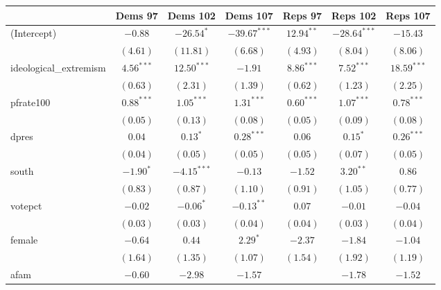 \documentclass[12pt]{article}
\begin{document}
\begin{table}
	\begin{center}
		\begin{tabular}{l c c c c c c }
			\hline
			& Dems 97 & Dems 102 & Dems 107 & Reps 97 & Reps 102 & Reps 107 \\
			\hline
			(Intercept)            & $-0.88$      & $-26.54^{*}$  & $-39.67^{***}$ & $12.94^{**}$ & $-28.64^{***}$ & $-15.43$      \\
			& $(4.61)$     & $(11.81)$     & $(6.68)$       & $(4.93)$     & $(8.04)$       & $(8.06)$      \\
			ideological\_extremism & $4.56^{***}$ & $12.50^{***}$ & $-1.91$        & $8.86^{***}$ & $7.52^{***}$   & $18.59^{***}$ \\
			& $(0.63)$     & $(2.31)$      & $(1.39)$       & $(0.62)$     & $(1.23)$       & $(2.25)$      \\
			pfrate100              & $0.88^{***}$ & $1.05^{***}$  & $1.31^{***}$   & $0.60^{***}$ & $1.07^{***}$   & $0.78^{***}$  \\
			& $(0.05)$     & $(0.13)$      & $(0.08)$       & $(0.05)$     & $(0.09)$       & $(0.08)$      \\
			dpres                  & $0.04$       & $0.13^{*}$    & $0.28^{***}$   & $0.06$       & $0.15^{*}$     & $0.26^{***}$  \\
			& $(0.04)$     & $(0.05)$      & $(0.05)$       & $(0.05)$     & $(0.07)$       & $(0.05)$      \\
			south                  & $-1.90^{*}$  & $-4.15^{***}$ & $-0.13$        & $-1.52$      & $3.20^{**}$    & $0.86$        \\
			& $(0.83)$     & $(0.87)$      & $(1.10)$       & $(0.91)$     & $(1.05)$       & $(0.77)$      \\
			votepct                & $-0.02$      & $-0.06^{*}$   & $-0.13^{**}$   & $0.07$       & $-0.01$        & $-0.04$       \\
			& $(0.03)$     & $(0.03)$      & $(0.04)$       & $(0.04)$     & $(0.03)$       & $(0.04)$      \\
			female                 & $-0.64$      & $0.44$        & $2.29^{*}$     & $-2.37$      & $-1.84$        & $-1.04$       \\
			& $(1.64)$     & $(1.35)$      & $(1.07)$       & $(1.54)$     & $(1.92)$       & $(1.19)$      \\
			afam                   & $-0.60$      & $-2.98$       & $-1.57$        &              & $-1.78$        & $-1.52$       \\

\end{tabular}
\end{center}
\end{table}
\end{document}
